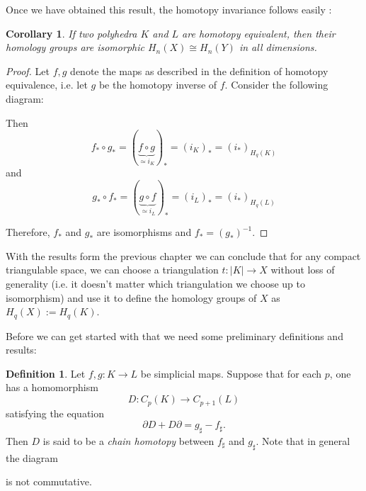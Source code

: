 \documentclass[toc=bib, headinclude]{scrartcl}
\theoremstyle{plain}
\newtheorem{corollary}[theorem]{Corollary}
\theoremstyle{definition}
\newtheorem	{definition}[theorem]{Definition}
\theoremstyle{remark}
\newcommand{\isom}{\cong}
\begin{document}
Once we have obtained this result, the homotopy invariance follows easily \parencite[see][Theorem 8.11]{ar}:
\begin{corollary}
	If two polyhedra $K$ and $L$ are homotopy equivalent, then their homology groups are isomorphic $H_n(X)\isom H_n(Y)$ in all dimensions.
\end{corollary}
\begin{proof}
	Let $f,g$ denote the maps as described in the definition of homotopy equivalence, i.e. let $g$ be the homotopy inverse of $f$. 
	Consider the following diagram:
	\begin{center}
	
	\end{center}

	Then 
	\[f_\ast\circ g_\ast=(\underset{\ensuremath{\simeq i_K}}{\underbrace{f\circ g}})_\ast=(i_K)_\ast=(i_\ast)_{H_q(K)}\]
	and
	\[g_\ast\circ f_\ast=(\underset{\ensuremath{\simeq i_L}}{\underbrace{g\circ f}})_\ast=(i_L)_\ast=(i_\ast)_{H_q(L)}\]
	
	Therefore, $f_\ast$ and $g_\ast$ are isomorphisms and $f_\ast=(g_\ast)^{-1}$.
\end{proof}

With the results form the previous chapter we can conclude that for any compact triangulable space, we can choose a triangulation $t:|K|\to X$ without loss of generality (i.e. it doesn't matter which triangulation we choose up to isomorphism) and use it to define the homology groups  of $X$ as $H_q(X):=H_q(K)$.



Before we can get started with that we need some preliminary definitions and results:


\begin{definition}
	Let $f,g:K\to L$ be simplicial maps. Suppose that for each $p$, one has a homomorphism \[
	D: C_p(K)\to C_{p+1}(L)
	\] satisfying the equation
	\[
	\partial D+D\partial=g_\sharp-f_\sharp.
	\]
	Then $D$ is said to be a \textit{chain homotopy} between $f_\sharp$ and $g_\sharp$. Note that in general the diagram
	\begin{center}
		
	\end{center}
	is not commutative.
\end{definition}
\end{document}
